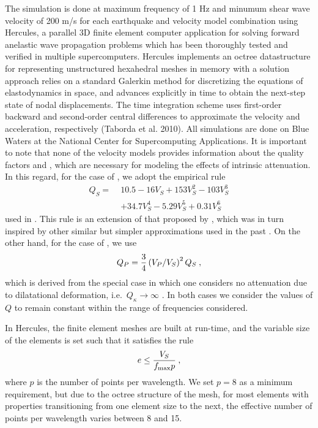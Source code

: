 The simulation is done at maximum frequency of 1 Hz and minumum shear wave velocity of 200 m/s for each earthquake and velocity model combination using Hercules, a parallel 3D finite element computer application for solving forward anelastic wave propagation problems which has been thoroughly tested and verified in multiple supercomputers. Hercules implements an octree datastructure for representing unstructured hexahedral meshes in memory \citep{Tu_2006_Proc} with a solution approach relies on a standard Galerkin method for discretizing the equations of elastodynamics in space, and advances explicitly in time to obtain the next-step state of nodal displacements. The time integration scheme uses first-order backward and second-order central differences to approximate the velocity and acceleration, respectively (Taborda et al. 2010). All simulations are done on Blue Waters at the National Center for Supercomputing Applications.
It is important to note that none of the velocity models provides information about the quality factors \qp{} and \qs{}, which are necessary for modeling the effects of intrinsic attenuation. In this regard, for the case of \qs{}, we adopt the empirical rule
%
\begin{align}
	Q_S =\; 
		& 10.5 - 16 V_S + 153 V_S^2 - 103 V_S^3 
		\nonumber \\
		& + 34.7 V_S^4 - 5.29 V_S^5 + 0.31 V_S^6
	\label{eq:qs}
\end{align}
%
\noindent
used in \citet{Taborda_2013_BSSA, Taborda_2014_BSSA}. This rule is an extension of that proposed by \citet{Brocher_2005_Tech, Brocher_2008_BSSA}, which was in turn inspired by other similar but simpler approximations used in the past \citep[e.g.][]{Olsen_2003_BSSA, Graves_2008_BSSA}. On the other hand, for the case of \qp{}, we use
%
\begin{equation}
	Q_P = \frac{3}{4}\left( V_P / V_S \right)^2 Q_S
	\hspace{.25em},
	\label{eq:qp}
\end{equation} 
% 
which is derived from the special case in which one considers no attenuation due to dilatational deformation, i.e.~$Q_\kappa \rightarrow \infty$ \citep[e.g.,][]{Stein_2003_Book, Shearer_2009_Book}. In both cases we consider the values of $Q$ to remain constant within the range of frequencies considered.

In Hercules, the finite element meshes are built at run-time, and the variable size of the elements is set such that it satisfies the rule
%
\begin{equation}
	e \leq \frac{V_S}{f_{\max} p}
	\hspace{.25em},
	\label{eq:esize}
\end{equation} 
% 
where $p$ is the number of points per wavelength. We set $p=8$ as a minimum requirement, but due to the octree structure of the mesh, for most elements with properties transitioning from one element size to the next, the effective number of points per wavelength varies between 8 and 15.
